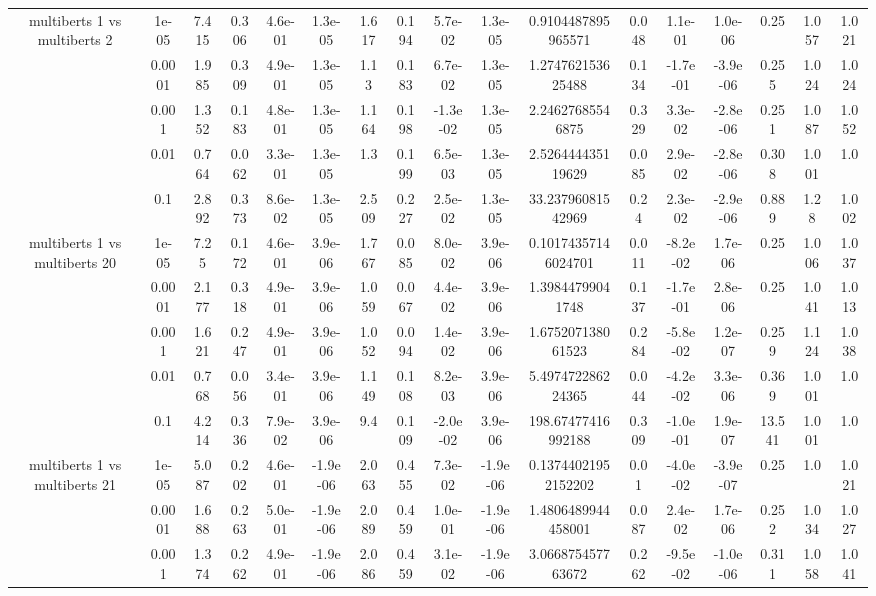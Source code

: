 \begin{tabular}{|c|c|c|c|c|c|c|c|c|c|c|c|c|c|c|c|c|}
\hline
\multirow{5}{*}{multiberts 1 vs multiberts 2} & 1e-05 & 7.415 & 0.306 & 4.6e-01 & 1.3e-05 & 1.617 & 0.194 & 5.7e-02 & 1.3e-05 & 0.9104487895965571 & 0.048 & 1.1e-01 & 1.0e-06 & 0.25 & 1.057 & 1.021 \\
 & 0.0001 & 1.985 & 0.309 & 4.9e-01 & 1.3e-05 & 1.13 & 0.183 & 6.7e-02 & 1.3e-05 & 1.274762153625488 & 0.134 & -1.7e-01 & -3.9e-06 & 0.255 & 1.024 & 1.024 \\
 & 0.001 & 1.352 & 0.183 & 4.8e-01 & 1.3e-05 & 1.164 & 0.198 & -1.3e-02 & 1.3e-05 & 2.24627685546875 & 0.329 & 3.3e-02 & -2.8e-06 & 0.251 & 1.087 & 1.052 \\
 & 0.01 & 0.764 & 0.062 & 3.3e-01 & 1.3e-05 & 1.3 & 0.199 & 6.5e-03 & 1.3e-05 & 2.526444435119629 & 0.085 & 2.9e-02 & -2.8e-06 & 0.308 & 1.001 & 1.0 \\
 & 0.1 & 2.892 & 0.373 & 8.6e-02 & 1.3e-05 & 2.509 & 0.227 & 2.5e-02 & 1.3e-05 & 33.23796081542969 & 0.24 & 2.3e-02 & -2.9e-06 & 0.889 & 1.28 & 1.002 \\
\hline
\multirow{5}{*}{multiberts 1 vs multiberts 20} & 1e-05 & 7.25 & 0.172 & 4.6e-01 & 3.9e-06 & 1.767 & 0.085 & 8.0e-02 & 3.9e-06 & 0.10174357146024701 & 0.011 & -8.2e-02 & 1.7e-06 & 0.25 & 1.006 & 1.037 \\
 & 0.0001 & 2.177 & 0.318 & 4.9e-01 & 3.9e-06 & 1.059 & 0.067 & 4.4e-02 & 3.9e-06 & 1.39844799041748 & 0.137 & -1.7e-01 & 2.8e-06 & 0.25 & 1.041 & 1.013 \\
 & 0.001 & 1.621 & 0.247 & 4.9e-01 & 3.9e-06 & 1.052 & 0.094 & 1.4e-02 & 3.9e-06 & 1.675207138061523 & 0.284 & -5.8e-02 & 1.2e-07 & 0.259 & 1.124 & 1.038 \\
 & 0.01 & 0.768 & 0.056 & 3.4e-01 & 3.9e-06 & 1.149 & 0.108 & 8.2e-03 & 3.9e-06 & 5.497472286224365 & 0.044 & -4.2e-02 & 3.3e-06 & 0.369 & 1.001 & 1.0 \\
 & 0.1 & 4.214 & 0.336 & 7.9e-02 & 3.9e-06 & 9.4 & 0.109 & -2.0e-02 & 3.9e-06 & 198.67477416992188 & 0.309 & -1.0e-01 & 1.9e-07 & 13.541 & 1.001 & 1.0 \\
\hline
\multirow{5}{*}{multiberts 1 vs multiberts 21} & 1e-05 & 5.087 & 0.202 & 4.6e-01 & -1.9e-06 & 2.063 & 0.455 & 7.3e-02 & -1.9e-06 & 0.13744021952152202 & 0.01 & -4.0e-02 & -3.9e-07 & 0.25 & 1.0 & 1.021 \\
 & 0.0001 & 1.688 & 0.263 & 5.0e-01 & -1.9e-06 & 2.089 & 0.459 & 1.0e-01 & -1.9e-06 & 1.4806489944458001 & 0.087 & 2.4e-02 & 1.7e-06 & 0.252 & 1.034 & 1.027 \\
 & 0.001 & 1.374 & 0.262 & 4.9e-01 & -1.9e-06 & 2.086 & 0.459 & 3.1e-02 & -1.9e-06 & 3.066875457763672 & 0.262 & -9.5e-02 & -1.0e-06 & 0.311 & 1.058 & 1.041 \\

\end{tabular}
